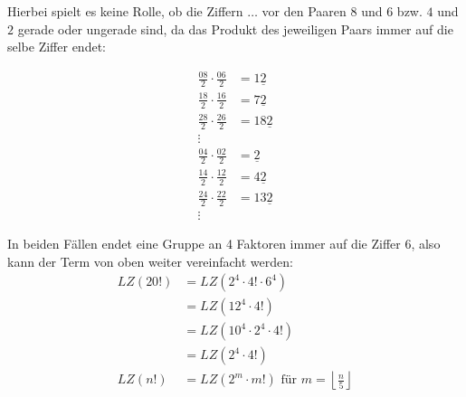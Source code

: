 \documentclass[12pt,a4paper,oneside]{article}
\newenvironment{Together}
{\vbox\bgroup}
{\egroup}
\begin{document}
\begin{Together}	
Hierbei spielt es keine Rolle, ob die Ziffern $\dots$ vor den Paaren $8$ und $6$ bzw. $4$ und $2$ gerade oder ungerade sind, da das Produkt des jeweiligen Paars immer auf die selbe Ziffer endet:
\begin{multicols}{2}
	\noindent
	\begin{equation*}
		\begin{split}
			\frac{08}{2} \cdot \frac{06}{2} &= 1\underline{2} \\
			\frac{18}{2} \cdot \frac{16}{2} &= 7\underline{2} \\
			\frac{28}{2} \cdot \frac{26}{2} &= 18\underline{2} \\
			\vdots
		\end{split}
	\end{equation*}
	\begin{equation*}
		\begin{split}
			\frac{04}{2} \cdot \frac{02}{2} &= \underline{2} \\
			\frac{14}{2} \cdot \frac{12}{2} &= 4\underline{2} \\
			\frac{24}{2} \cdot \frac{22}{2} &= 13\underline{2} \\
			\vdots
		\end{split}
	\end{equation*}
\end{multicols}
\end{Together}

In beiden Fällen endet eine Gruppe an 4 Faktoren immer auf die Ziffer $6$, also kann der Term von oben weiter vereinfacht werden:
\begin{equation*}
	\begin{split}
		LZ(20!) &= LZ\left(2^4 \cdot 4! \cdot 6^4\right) \\
		&= LZ\left(12^4 \cdot 4!\right) \\
		&= LZ\left(10^4 \cdot 2^4 \cdot 4!\right) \\
		&= LZ\left(2^4 \cdot 4!\right) \\
		LZ(n!) &= LZ\left(2^m \cdot m!\right) \text{ für } m = \left\lfloor\frac{n}{5}\right\rfloor
	\end{split}
\end{equation*}
\end{document}
